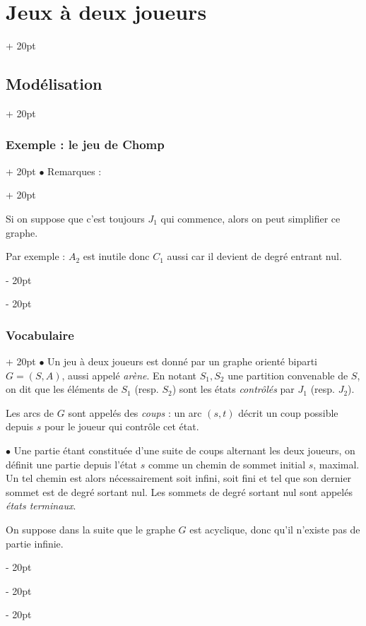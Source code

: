 \documentclass[a4paper, 12pt, twoside]{article}
\newcommand{\ind}[1][20pt]{\advance\leftskip + #1}
\newcommand{\deind}[1][20pt]{\advance\leftskip - #1}
\newenvironment{indt}[2][20pt]{#2 \par \ind[#1]}{\par \deind} %
\begin{document}
\begin{indt}{\section{Jeux à deux joueurs}}
\begin{indt}{\subsection{Modélisation}}
\begin{indt}{\subsubsection{Exemple : le jeu de Chomp}}
\begin{indt}{$\bullet$ Remarques :}
\begin{center}
                    \end{center}

                    Si on suppose que c'est toujours $J_1$ qui commence, alors on peut simplifier ce graphe.

                    Par exemple : $A_2$ est inutile donc $C_1$ aussi car il devient de degré entrant nul.
                \end{indt}
            \end{indt}

            \vspace{12pt}
            
            \begin{indt}{\subsubsection{Vocabulaire}}
                $\bullet$ Un jeu à deux joueurs est donné par un graphe orienté biparti $G = (S, A)$, aussi appelé \emph{arène}.
                En notant $S_1, S_2$ une partition convenable de $S$, on dit que les éléments de $S_1$ (resp. $S_2$) sont les états \emph{contrôlés} par $J_1$ (resp. $J_2$).

                Les arcs de $G$ sont appelés des \emph{coups} : un arc $(s, t)$ décrit un coup possible depuis $s$ pour le joueur qui contrôle cet état.

                \vspace{12pt}
                
                $\bullet$ Une partie étant constituée d'une suite de coups alternant les deux joueurs, on définit une partie depuis l'état $s$ comme un chemin de sommet initial $s$, maximal.
                Un tel chemin est alors nécessairement soit infini, soit fini et tel que son dernier sommet est de degré sortant nul. Les sommets de degré sortant nul sont appelés \emph{états terminaux}.

                On suppose dans la suite que le graphe $G$ est acyclique, donc qu'il n'existe pas de partie infinie.


\end{indt}
\end{indt}
\end{indt}
\end{document}

